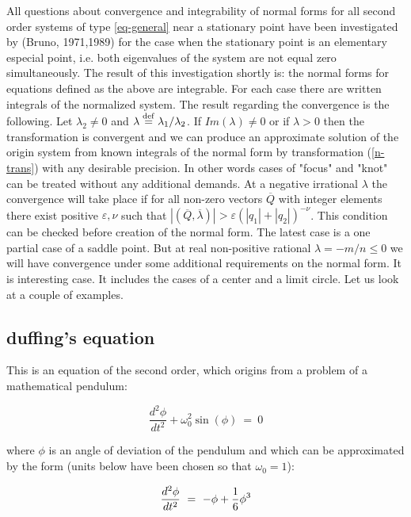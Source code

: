 All questions about convergence and integrability of normal forms for 
all second order systems of type \ref{eq-general} near a stationary 
point have been investigated by (Bruno, 1971,1989) for the case when 
the stationary point is an elementary especial point, i.e. both 
eigenvalues of the system are not equal zero simultaneously.
The result of this investigation shortly is: the normal forms for
equations defined as the above are integrable. For each case there are 
written integrals of the normalized system. The result regarding the
convergence is the following. 
Let $\lambda_2 \neq 0$ and $\lambda \stackrel{\rm def}{=}
 \lambda_1/\lambda_2$. If $Im(\lambda) \neq 0$ or if 
$\lambda > 0$ then the transformation is convergent and we can
produce an approximate solution of the origin system from known
integrals of the normal form by transformation (\ref{n-trans}) with 
any desirable precision. In other words cases of "focus" and "knot" 
can be treated without any additional demands. At a negative irrational
$\lambda$ the convergence will take place if for all non-zero vectors 
$\overline{Q}$ with integer elements there exist positive $\varepsilon,\nu$ 
such that $|(\overline{Q},\overline{\lambda})| > \varepsilon 
(|q_1|+|q_2|)^{-\nu}$. This condition can be checked before
creation of the normal form. The latest case is a one partial case
of a saddle point. 
But at real non-positive rational $\lambda = -m/n \leq 0$ we will have
convergence under some additional 
requirements on the normal form. It is interesting case. It includes
the cases of a center and a limit circle. Let us look at a couple
of examples.

\subsection{duffing's equation}

   This is an equation of the second order, which origins from a
problem of a mathematical pendulum:

\begin{equation}
\label{eq-pendulum}
\frac{d^{2}\phi}{dt^2}+\omega_0^2\sin(\phi) \ = \ 0
\end{equation}


\noindent 
where $\phi$ is an angle of deviation of the pendulum and 
which can be approximated by the form (units below have been chosen so 
that $\omega_0 = 1$):

\begin{equation}
\label{eq-pend}
\frac{d^{2}\phi}{dt^2} \ = \ - \phi + {1 \over 6}\phi^3
\end{equation}

